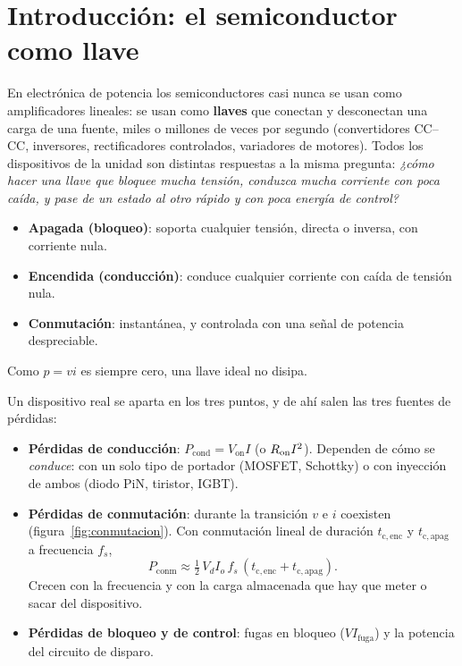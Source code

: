 \section{Introducción: el semiconductor como llave}
\label{sec:intro}

En electrónica de potencia los semiconductores casi nunca se usan como amplificadores lineales: se
usan como \textbf{llaves} que conectan y desconectan una carga de una fuente, miles o millones de
veces por segundo (convertidores CC--CC, inversores, rectificadores controlados, variadores de
motores). Todos los dispositivos de la unidad  son distintas respuestas a la misma
pregunta: \emph{¿cómo hacer una llave que bloquee mucha tensión, conduzca mucha corriente con poca
caída, y pase de un estado al otro rápido y con poca energía de control?}

\begin{definicion}
\begin{itemize}
  \item \textbf{Apagada (bloqueo)}: soporta cualquier tensión, directa o inversa, con corriente nula.
  \item \textbf{Encendida (conducción)}: conduce cualquier corriente con caída de tensión nula.
  \item \textbf{Conmutación}: instantánea, y controlada con una señal de potencia despreciable.
\end{itemize}
Como $p=vi$ es siempre cero, una llave ideal no disipa.
\end{definicion}

Un dispositivo real se aparta en los tres puntos, y de ahí salen las tres fuentes de pérdidas:
\begin{itemize}
  \item \textbf{Pérdidas de conducción}: $P_{\mathrm{cond}}=V_{\mathrm{on}}I$ (o $R_{\mathrm{on}} I^2$). Dependen de
  cómo se \emph{conduce}: con un solo tipo de portador (MOSFET, Schottky) o con inyección de ambos
  (diodo PiN, tiristor, IGBT).
  \item \textbf{Pérdidas de conmutación}: durante la transición $v$ e $i$ coexisten (figura~\ref{fig:conmutacion}).
  Con conmutación lineal de duración $t_{\mathrm{c,enc}}$ y $t_{\mathrm{c,apag}}$ a frecuencia $f_s$,
  \[
     P_{\mathrm{conm}} \approx \tfrac12\,V_d I_o\,f_s\,(t_{\mathrm{c,enc}}+t_{\mathrm{c,apag}}).
  \]
  Crecen con la frecuencia y con la carga almacenada que hay que meter o sacar del dispositivo.
  \item \textbf{Pérdidas de bloqueo y de control}: fugas en bloqueo ($V I_{\mathrm{fuga}}$) y la
  potencia del circuito de disparo.
\end{itemize}

